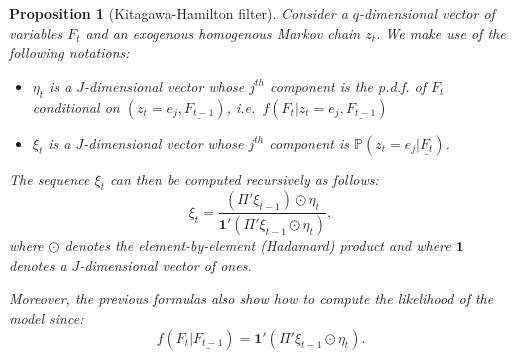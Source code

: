\documentclass[
  12pt,
]{book}
\providecommand{\tightlist}{%
  \setlength{\itemsep}{0pt}\setlength{\parskip}{0pt}}
\newtheorem{proposition}{Proposition}[chapter]
\theoremstyle{definition}
\theoremstyle{definition}
\theoremstyle{definition}
\theoremstyle{definition}
\theoremstyle{remark}
\begin{document}
\begin{proposition}[Kitagawa-Hamilton filter]
\protect\hypertarget{prp:KitagHamilton}{}\label{prp:KitagHamilton}Consider a \(q\)-dimensional vector of variables \(F_t\) and an exogenous homogenous Markov chain \(z_t\). We make use of the following notations:

\begin{itemize}
\tightlist
\item
  \(\eta_t\) is a \(J\)-dimensional vector whose \(j^{th}\) component is the p.d.f. of \(F_t\) conditional on \((z_t = e_j,\underline{F_{t-1}})\), i.e.~\(f(F_t|z_t=e_j,\underline{F_{t-1}})\)
\item
  \(\xi_{t}\) is a \(J\)-dimensional vector whose \(j^{th}\) component is \(\mathbb{P}(z_t = e_j|\underline{F_t})\).
\end{itemize}

The sequence \(\xi_{t}\) can then be computed recursively as follows:
\begin{equation}
\xi_t = \frac{(\Pi' \xi_{t-1}) \odot \eta_t}{\mathbf{1}'(\Pi' \xi_{t-1} \odot \eta_t)},\label{eq:KHfilter}
\end{equation}
where \(\odot\) denotes the element-by-element (Hadamard) product and where \(\mathbf{1}\) denotes a \(J\)-dimensional vector of ones.

Moreover, the previous formulas also show how to compute the likelihood of the model since:
\begin{equation}
f(F_t|\underline{F_{t-1}})=\mathbf{1}'(\Pi' \xi_{t-1} \odot \eta_t).\label{eq:KHlikelihood}
\end{equation}
\end{proposition}
\end{document}
